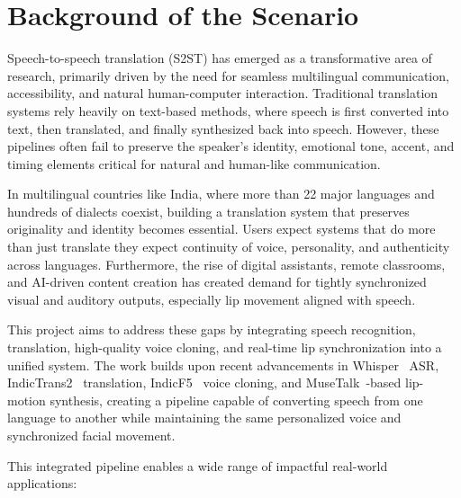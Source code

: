 \documentclass[12pt,oneside]{report}
\begin{document}
\section{Background of the Scenario}

Speech-to-speech translation (S2ST) has emerged as a transformative area of research, primarily driven by the need for seamless multilingual communication, accessibility, and natural human-computer interaction. Traditional translation systems rely heavily on text-based methods, where speech is first converted into text, then translated, and finally synthesized back into speech. However, these pipelines often fail to preserve the speaker's identity, emotional tone, accent, and timing elements critical for natural and human-like communication.

In multilingual countries like India, where more than 22 major languages and hundreds of dialects coexist, building a translation system that preserves originality and identity becomes essential. Users expect systems that do more than just translate they expect continuity of voice, personality, and authenticity across languages. Furthermore, the rise of digital assistants, remote classrooms, and AI-driven content creation has created demand for tightly synchronized visual and auditory outputs, especially lip movement aligned with speech.

This project aims to address these gaps by integrating speech recognition, translation, high-quality voice cloning, and real-time lip synchronization into a unified system. The work builds upon recent advancements in Whisper~\cite{radford2023whisper} ASR, IndicTrans2~\cite{gala2023indictrans2} translation, IndicF5~\cite{indicf5_2025} voice cloning, and MuseTalk~\cite{zhang2023musetalk}-based lip-motion synthesis, creating a pipeline capable of converting speech from one language to another while maintaining the same personalized voice and synchronized facial movement.

This integrated pipeline enables a wide range of impactful real-world applications:
\end{document}
